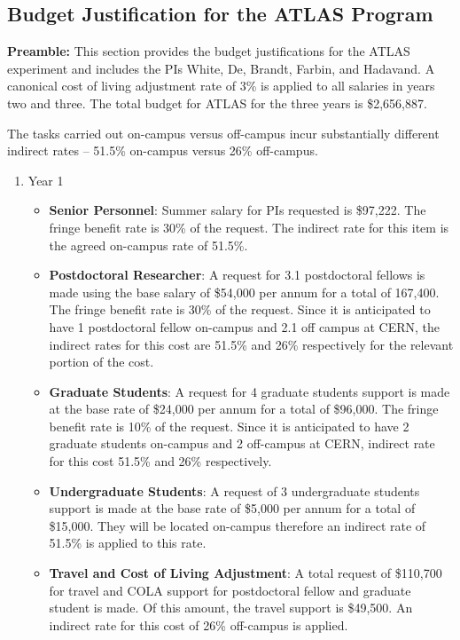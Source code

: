 \subsection{Budget Justification for the ATLAS Program}
{\bf Preamble:} This section provides the budget justifications for the ATLAS experiment and includes the PIs White, De, Brandt, Farbin, and Hadavand.  A canonical cost of living adjustment rate of 3\% is applied to all salaries in years two and three. 
The total budget for ATLAS for the three years is \$2,656,887.

The tasks carried out on-campus versus off-campus incur substantially different indirect rates – 51.5\% on-campus versus 26\% off-campus. 

\begin{enumerate}
\item{Year 1}
\begin{itemize}
\item{{\bf Senior Personnel}: Summer salary for PIs requested is \$97,222.   The fringe benefit rate is 30\% of the request.  The indirect rate for this item is the agreed on-campus rate of 51.5\%.}

\item {{\bf Postdoctoral Researcher}: A request for 3.1 postdoctoral fellows is made using the base salary of \$54,000 per annum for a total of 167,400.  The fringe benefit rate is 30\% of the request.  Since it is anticipated to have 1 postdoctoral fellow on-campus and 2.1 off campus at CERN, the indirect rates for this cost are 51.5\%  and 26\% respectively for the relevant portion of the cost.} 

\item{{\bf Graduate Students}: A request for 4 graduate students support is made at the base rate of \$24,000 per annum for a total of \$96,000.   The fringe benefit rate is 10\% of the request.  Since it is anticipated to have 2 graduate students on-campus and 2 off-campus at CERN, indirect rate for this cost 51.5\% and 26\% respectively.}

\item {{\bf Undergraduate Students}: A request of 3 undergraduate students support is made at the base rate of \$5,000 per annum for a total of \$15,000. They will be located on-campus therefore an indirect rate of 51.5\% is applied to this rate. }

\item{{\bf Travel and Cost of Living Adjustment}: A total request of \$110,700 for travel and COLA support for postdoctoral fellow and graduate student is made. Of this amount, the travel support is \$49,500.  An indirect rate for this cost of 26\% off-campus is applied. }


\end{itemize}
\end{enumerate}
